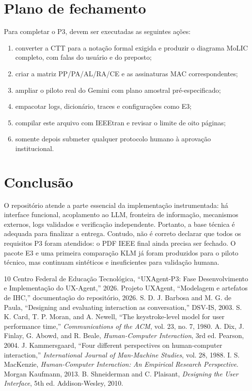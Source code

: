 \documentclass[conference]{IEEEtran}
\begin{document}
\section{Plano de fechamento}
Para completar o P3, devem ser executadas as seguintes ações:
\begin{enumerate}
\item converter a CTT para a notação formal exigida e produzir o diagrama
MoLIC completo, com falas do usuário e do preposto;
\item criar a matriz PP/PA/AL/RA/CE e as assinaturas MAC correspondentes;
\item ampliar o piloto real do Gemini com plano amostral pré-especificado;
\item empacotar logs, dicionário, traces e configurações como E3;
\item compilar este arquivo com IEEEtran e revisar o limite de oito páginas;
\item somente depois submeter qualquer protocolo humano à aprovação
institucional.
\end{enumerate}

\section{Conclusão}
O repositório atende a parte essencial da implementação instrumentada: há
interface funcional, acoplamento ao LLM, fronteira de informação, mecanismos
externos, logs validados e verificação independente. Portanto, a base técnica
é adequada para finalizar a entrega. Contudo, não é correto declarar que todos
os requisitos P3 foram atendidos: o PDF IEEE final ainda precisa ser fechado.
O pacote E3 e uma primeira
comparação KLM já foram produzidos para o piloto técnico, mas continuam
sintéticos e insuficientes para validação humana.

\begin{thebibliography}{10}
 Centro Federal de Educação Tecnológica, ``UXAgent-P3: Fase Desenvolvimento e Implementação do UX-Agent,'' 2026.
 Projeto UXAgent, ``Modelagem e artefatos de IHC,'' documentação do repositório, 2026.
 S. D. J. Barbosa and M. G. de Paula, ``Designing and evaluating interaction as conversation,'' DSV-IS, 2003.
 S. K. Card, T. P. Moran, and A. Newell, ``The keystroke-level model for user performance time,'' \emph{Communications of the ACM}, vol. 23, no. 7, 1980.
 A. Dix, J. Finlay, G. Abowd, and R. Beale, \emph{Human-Computer Interaction}, 3rd ed. Pearson, 2004.
 J. Kammersgaard, ``Four different perspectives on human-computer interaction,'' \emph{International Journal of Man-Machine Studies}, vol. 28, 1988.
 I. S. MacKenzie, \emph{Human-Computer Interaction: An Empirical Research Perspective}. Morgan Kaufmann, 2013.
 B. Shneiderman and C. Plaisant, \emph{Designing the User Interface}, 5th ed. Addison-Wesley, 2010.
\end{thebibliography}
\end{document}

